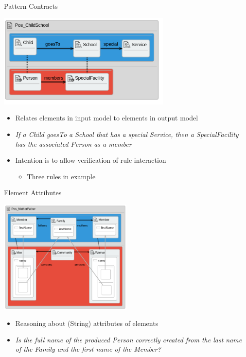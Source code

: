 \documentclass[12pt, handout]{beamer}
\begin{document}
\begin{frame}{Pattern Contracts}
\begin{center}
\includegraphics[width=0.65\textwidth]{figures/Pos_ChildSchool}
\end{center}
\begin{itemize}
\item Relates elements in input model to elements in output model
\item \textit{If a Child goesTo a School that has a special Service, then a SpecialFacility has the associated Person as a member}
\item Intention is to allow verification of rule interaction
\begin{itemize}
\item Three rules in example
\end{itemize}
\end{itemize}
\end{frame}


\begin{frame}{Element Attributes}
\begin{center}
\includegraphics[width=0.50\textwidth]{figures/Pos_MotherFather}
\end{center}
\pause
\begin{itemize}[<+->]
\item Reasoning about (String) attributes of elements
\item \textit{Is the full name of the produced Person correctly created from the last name of the Family and the first name of the Member?}
\end{itemize}
\end{frame}
\end{document}
